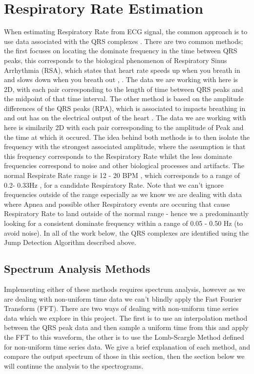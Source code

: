 \chapter{Respiratory Rate Estimation}

When estimating Respiratory Rate from ECG signal, the common approach is to use 
data associated with the QRS complexes \cite{MIRMOHAMADSADEGHI201466}. There are two common methods; the first focuses on locating 
the dominate frequency in the time between QRS peaks, this corresponds to the biological phenomenon of 
Respiratory Sinus Arrhythmia (RSA), which states that heart rate speeds up when you breath in and slows down when you breath out
\cite{clevelandclinic_sinus_arrhythmia}, \cite{MIRMOHAMADSADEGHI201466}. The data we are working with here is 2D, with each pair corresponding 
to the length of time between QRS peaks and the midpoint of that time interval. The other method is based on the amplitude differences of the QRS peaks (RPA),
which is associated to impacts breathing in and out has on the electrical output of the heart \cite{MIRMOHAMADSADEGHI201466}. The 
data we are working with here is similarily 2D with each pair corresponding to the amplitude of Peak and the time at which it occured.
The idea behind both methods is to then isolate the frequency with the strongest associated amplitude, where 
the assumption is that this frequency corresponds to the  Respiratory Rate whilst the less dominate frequencies correspond to noise 
and other biological processes and artifacts. The normal Respirate Rate range is 12 - 20 BPM \cite{chourpiliadis2022respiratory}, which corresponds to a range of  0.2- 0.33Hz , for a candidate
Respiratory Rate. Note that we can't ignore frequencies outside of the range especially as we know we are dealing with data where Apnea and possible
other Respiratory events are occuring that cause Respiratory Rate to land outside of the normal range - hence we a predominantly looking for a consistent
dominate frequency  within a range of 0.05 - 0.50 Hz (to avoid noise). In all of the work below, 
the QRS complexes are identified 
using the Jump Detection Algorithm described above.  

\section{Spectrum Analysis Methods}
Implementing either of these methods requires spectrum analysis, however as we are dealing with non-uniform time data we can't blindly
apply the Fast Fourier Transform (FFT). There are two ways of dealing with non-uniform time series data which we explore in 
this project. The first is to use an interpolation method between the QRS peak data and then sample a uniform time 
from this and apply the FFT to this waveform, the other is to use the Lomb-Scargle Method defined for non-uniform time 
series data. We give a brief explanation of each method, and compare the output spectrum of those in this section, then the section below we will continue the analysis to 
the spectrograms. 

